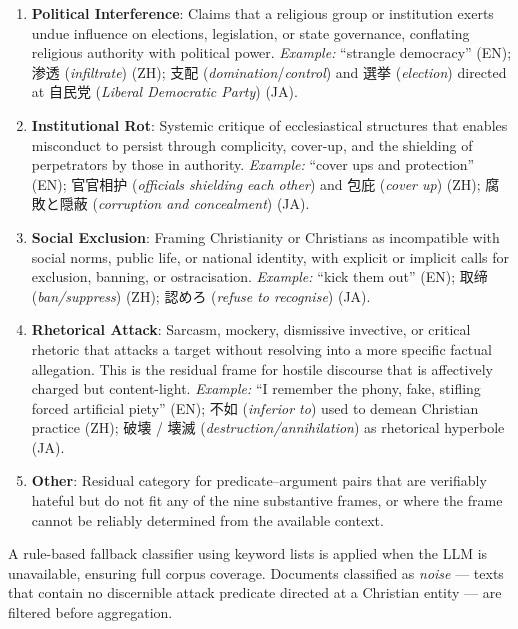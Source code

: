 \documentclass[../CLthesis.tex]{subfiles}
\begin{document}
\begin{enumerate}
    \item \textbf{Political Interference}: Claims that a religious group or institution exerts undue influence on elections, legislation, or state governance, conflating religious authority with political power. \textit{Example:} ``strangle democracy'' (EN); 渗透 (\textit{infiltrate}) (ZH); 支配 (\textit{domination}/\textit{control}) and 選挙 (\textit{election}) directed at 自民党 (\textit{Liberal Democratic Party}) (JA).

    \item \textbf{Institutional Rot}: Systemic critique of ecclesiastical structures that enables misconduct to persist through complicity, cover-up, and the shielding of perpetrators by those in authority. \textit{Example:} ``cover ups and protection'' (EN); 官官相护 (\textit{officials shielding each other}) and 包庇 (\textit{cover up}) (ZH); 腐敗と隠蔽 (\textit{corruption and concealment}) (JA).

    \item \textbf{Social Exclusion}: Framing Christianity or Christians as incompatible with social norms, public life, or national identity, with explicit or implicit calls for exclusion, banning, or ostracisation. \textit{Example:} ``kick them out'' (EN); 取缔 (\textit{ban/suppress}) (ZH); 認めろ (\textit{refuse to recognise}) (JA).

    \item \textbf{Rhetorical Attack}: Sarcasm, mockery, dismissive invective, or critical rhetoric that attacks a target without resolving into a more specific factual allegation. This is the residual frame for hostile discourse that is affectively charged but content-light. \textit{Example:} ``I remember the phony, fake, stifling forced artificial piety'' (EN); 不如 (\textit{inferior to}) used to demean Christian practice (ZH); 破壊 / 壊滅 (\textit{destruction/annihilation}) as rhetorical hyperbole (JA).

    \item \textbf{Other}: Residual category for predicate--argument pairs that are verifiably hateful but do not fit any of the nine substantive frames, or where the frame cannot be reliably determined from the available context.
\end{enumerate}

A rule-based fallback classifier using keyword lists is applied when the LLM is unavailable, ensuring full corpus coverage. Documents classified as \textit{noise} — texts that contain no discernible attack predicate directed at a Christian entity — are filtered before aggregation.
\end{document}
